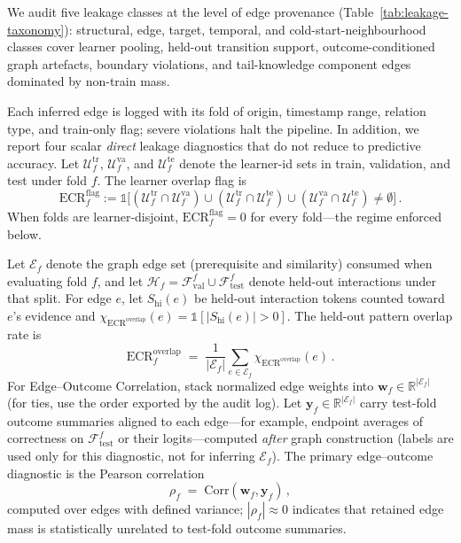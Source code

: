 \documentclass[pdflatex,sn-mathphys-num]{sn-jnl}
\newcommand{\KC}{knowledge component}
\begin{document}
We audit five leakage classes at the level of edge provenance
(Table~\ref{tab:leakage-taxonomy}): structural, edge, target, temporal, and
cold-start-neighbourhood classes cover learner pooling, held-out transition
support, outcome-conditioned graph artefacts, boundary violations, and
tail-\KC{} edges dominated by non-train mass.

Each inferred edge is logged with its fold of origin, timestamp range,
relation type, and train-only flag; severe violations halt the pipeline.
In addition, we report four scalar \emph{direct} leakage diagnostics that do
not reduce to predictive accuracy. Let $\mathcal{U}^{\mathrm{tr}}_f$,
$\mathcal{U}^{\mathrm{va}}_f$, and $\mathcal{U}^{\mathrm{te}}_f$ denote the
learner-id sets in train, validation, and test under fold $f$. The learner overlap flag is
\begin{equation}
\mathrm{ECR}^{\mathrm{flag}}_f := \mathbb{1}\big[
(\mathcal{U}^{\mathrm{tr}}_f \cap \mathcal{U}^{\mathrm{va}}_f) \cup
(\mathcal{U}^{\mathrm{tr}}_f \cap \mathcal{U}^{\mathrm{te}}_f) \cup
(\mathcal{U}^{\mathrm{va}}_f \cap \mathcal{U}^{\mathrm{te}}_f)
\neq \emptyset
\big]\,.
\label{eq:ecr-flag}
\end{equation}
When folds are learner-disjoint, $\mathrm{ECR}^{\mathrm{flag}}_f=0$ for every fold---the regime enforced below.

Let $\mathcal{E}_f$ denote the graph edge set (prerequisite and similarity) consumed when evaluating fold
$f$, and let $\mathcal{H}_f = \mathcal{F}_{\text{val}}^{f} \cup
\mathcal{F}_{\text{test}}^{f}$ denote held-out interactions under that
split. For edge $e$, let $S_{\text{hi}}(e)$ be held-out interaction tokens counted
toward $e$'s evidence and
$\chi_{\mathrm{ECR}^{\mathrm{overlap}}}(e)=\mathbb{1}[|S_{\text{hi}}(e)|>0]$.
The held-out pattern overlap rate is
\begin{equation}
\mathrm{ECR}^{\mathrm{overlap}}_f \;=\; \frac{1}{|\mathcal{E}_f|}\sum_{e\in\mathcal{E}_f}
\chi_{\mathrm{ECR}^{\mathrm{overlap}}}(e)\,.
\label{eq:ecr-overlap}
\end{equation}
For Edge--Outcome Correlation, stack normalized edge weights into
$\mathbf{w}_f\in\mathbb{R}^{|\mathcal{E}_f|}$ (for ties, use the order
exported by the audit log). Let $\mathbf{y}_f\in\mathbb{R}^{|\mathcal{E}_f|}$
carry test-fold outcome summaries aligned to each edge---for example,
endpoint averages of correctness on $\mathcal{F}_{\text{test}}^{f}$ or
their logits---computed \emph{after} graph construction (labels are used
only for this diagnostic, not for inferring $\mathcal{E}_f$).
The primary edge--outcome diagnostic is the Pearson correlation
\begin{equation}
\rho_f \;=\; \mathrm{Corr}(\mathbf{w}_f,\mathbf{y}_f)\,,
\label{eq:rho-edge-outcome}
\end{equation}
computed over edges with defined variance; $|\rho_f|\!\approx\!0$ indicates
that retained edge mass is statistically unrelated to test-fold outcome
summaries.
\end{document}
